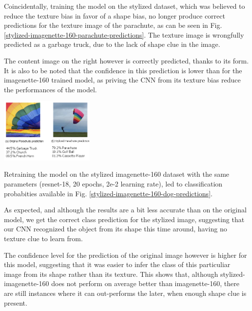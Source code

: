 \documentclass{article}
\begin{document}
\noindent
Coincidentally, training the model on the stylized dataset, 
which was believed to reduce the texture bias in favor of a shape bias, no longer produce correct predictions
for the texture image of the parachute, 
as can be seen in Fig. \ref{stylized-imagenette-160-parachute-predictions}. 
The texture image is wrongfully predicted as a garbage truck, 
due to the lack of shape clue in the image. \medskip \par

\noindent
The content image on the right however is correctly predicted, thanks to its form. 
It is also to be noted that the confidence in this prediction is lower than for the imagenette-160 trained model,
as priving the CNN from its texture bias reduce the performances of the model. \medskip \par

\begin{center}
  \captionsetup{type=figure}
  \includegraphics[width=0.35\textwidth]{imgs/experiment-1/stylized-imagenette-160-parachute-predictions}
  \label{stylized-imagenette-160-parachute-predictions}
\end{center}

\noindent
Retraining the model on the stylized imagenette-160 dataset with the same parameters 
(resnet-18, 20 epochs, 2e-2 learning rate), 
led to classification probabities available in 
Fig. \ref{stylized-imagenette-160-dog-predictions}. \medskip \par

\noindent
As expected, and although the results are a bit less accurate than on the original model, 
we get the correct class prediction for the stylized image, suggesting that our CNN recognized the object
from its shape this time around, having no texture clue to learn from. \medskip \par

\noindent
The confidence level for the prediction of the original image however is higher for this model, 
suggesting that it was easier to infer the class of this particuliar image 
from its shape rather than its texture. 
This shows that, although stylized-imagenette-160 does not perform on average better than imagenette-160,
there are still instances where it can out-performs the later, when enough shape clue is present. \medskip \par
\end{document}
